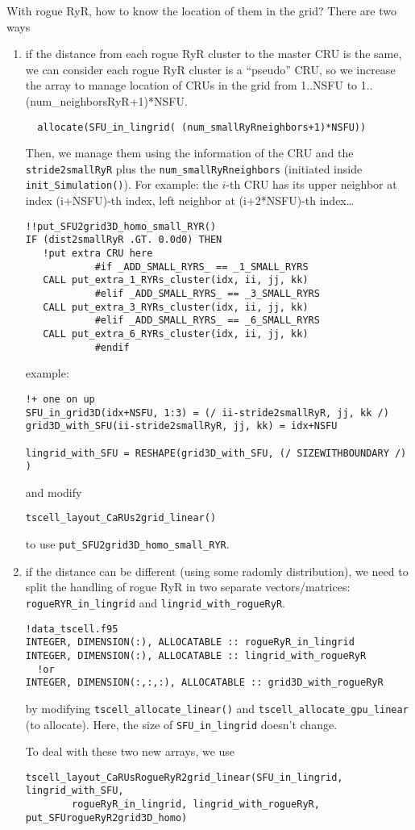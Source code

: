 With rogue RyR, how to know the location of them in the grid? There are
two ways
\begin{enumerate}
  \item if the distance from each rogue RyR cluster to the master CRU is the
  same, we can consider each rogue RyR cluster is a ``pseudo'' CRU, so we
  increase the array to manage location of CRUs in the grid from 1..NSFU to 
  1..(num\_neighborsRyR+1)*NSFU.
  \begin{verbatim}
  allocate(SFU_in_lingrid( (num_smallRyRneighbors+1)*NSFU))
  \end{verbatim}
  Then, we manage them using the information of the CRU and the
  \verb!stride2smallRyR! plus the \verb!num_smallRyRneighbors! (initiated
  inside \verb!init_Simulation()!). For example: the $i$-th CRU has its
  upper neighbor at index (i+NSFU)-th index, left neighbor at (i+2*NSFU)-th
  index\ldots
\begin{verbatim}
!!put_SFU2grid3D_homo_small_RYR()
IF (dist2smallRyR .GT. 0.0d0) THEN 
   !put extra CRU here
            #if _ADD_SMALL_RYRS_ == _1_SMALL_RYRS
   CALL put_extra_1_RYRs_cluster(idx, ii, jj, kk)
            #elif _ADD_SMALL_RYRS_ == _3_SMALL_RYRS
   CALL put_extra_3_RYRs_cluster(idx, ii, jj, kk)
            #elif _ADD_SMALL_RYRS_ == _6_SMALL_RYRS
   CALL put_extra_6_RYRs_cluster(idx, ii, jj, kk)
            #endif

\end{verbatim}  
example:
\begin{verbatim}
!+ one on up
SFU_in_grid3D(idx+NSFU, 1:3) = (/ ii-stride2smallRyR, jj, kk /)
grid3D_with_SFU(ii-stride2smallRyR, jj, kk) = idx+NSFU

lingrid_with_SFU = RESHAPE(grid3D_with_SFU, (/ SIZEWITHBOUNDARY /) )
\end{verbatim}
and modify
\begin{verbatim}
tscell_layout_CaRUs2grid_linear()
\end{verbatim}
to use \verb!put_SFU2grid3D_homo_small_RYR!.

  \item if the distance can be different (using some radomly distribution), we
  need to split the handling of rogue RyR in two separate vectors/matrices:
  \verb!rogueRYR_in_lingrid! and \verb!lingrid_with_rogueRyR!. 
\begin{verbatim}
!data_tscell.f95
INTEGER, DIMENSION(:), ALLOCATABLE :: rogueRyR_in_lingrid
INTEGER, DIMENSION(:), ALLOCATABLE :: lingrid_with_rogueRyR
  !or
INTEGER, DIMENSION(:,:,:), ALLOCATABLE :: grid3D_with_rogueRyR  
\end{verbatim}
by modifying \verb!tscell_allocate_linear()! and
\verb!tscell_allocate_gpu_linear! (to allocate). Here, the size of
\verb!SFU_in_lingrid! doesn't change.

To deal with these two new arrays, we use
\begin{verbatim}
tscell_layout_CaRUsRogueRyR2grid_linear(SFU_in_lingrid, lingrid_with_SFU,
        rogueRyR_in_lingrid, lingrid_with_rogueRyR, put_SFUrogueRyR2grid3D_homo)
\end{verbatim}

\end{enumerate}

